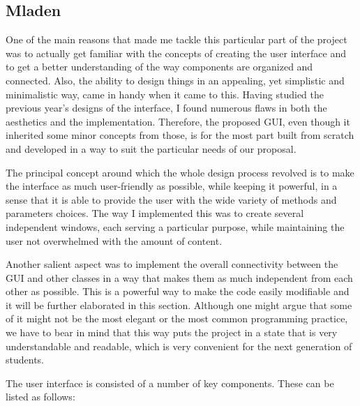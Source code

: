 \documentclass[aps,letterpaper,11pt]{revtex4}
\begin{document}
\subsection{Mladen}
One of the main reasons that made me tackle this particular part of the project was to actually get familiar with the concepts of creating the user interface and to get a better understanding of the way components are organized and connected. Also, the ability to design things in an appealing, yet simplistic and minimalistic way, came in handy when it came to this. Having studied the previous year’s designs of the interface, I found numerous flaws in both the aesthetics and the implementation. Therefore, the proposed GUI, even though it inherited some minor concepts from those, is for the most part built from scratch and developed in a way to suit the particular needs of our proposal.\par
The principal concept around which the whole design process revolved is to make the interface as much user-friendly as possible, while keeping it powerful, in a sense that it is able to provide the user with the wide variety of methods and parameters choices. The way I implemented this was to create several independent windows, each serving a particular purpose, while maintaining the user not overwhelmed with the amount of content.\par
Another salient aspect was to implement the overall connectivity between the GUI and other classes in a way that makes them as much independent from each other as possible. This is a powerful way to make the code easily modifiable and it will be further elaborated in this section. Although one might argue that some of it might not be the most elegant or the most common programming practice, we have to bear in mind that this way puts the project in a state that is very understandable and readable, which is very convenient for the next generation of students.\par
The user interface is consisted of a number of key components. These can be listed as follows:
\end{document}
